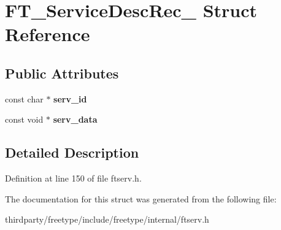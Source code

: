 \hypertarget{struct_f_t___service_desc_rec__}{}\section{F\+T\+\_\+\+Service\+Desc\+Rec\+\_\+ Struct Reference}
\label{struct_f_t___service_desc_rec__}
\subsection*{Public Attributes}
\begin{DoxyCompactItemize}
\item 
\mbox{\label{struct_f_t___service_desc_rec___ab706270db01e1398233571f10bd249d4}} 
const char $\ast$ {\bfseries serv\+\_\+id}
\item 
\mbox{\label{struct_f_t___service_desc_rec___aa597a33a2b0d099ec32882dc6aa38d59}} 
const void $\ast$ {\bfseries serv\+\_\+data}
\end{DoxyCompactItemize}


\subsection{Detailed Description}


Definition at line 150 of file ftserv.\+h.



The documentation for this struct was generated from the following file\+:\begin{DoxyCompactItemize}
\item 
thirdparty/freetype/include/freetype/internal/ftserv.\+h\end{DoxyCompactItemize}
